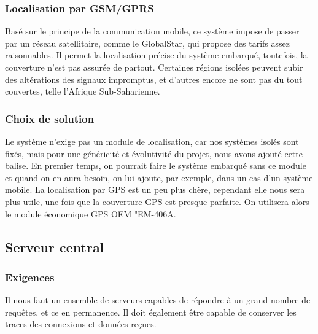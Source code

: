 \subsubsection{Localisation par GSM/GPRS}

Basé sur le principe de la communication mobile, ce système impose de passer par un réseau satellitaire, comme le GlobalStar, qui propose des tarifs assez raisonnables. Il permet la localisation précise du système embarqué, toutefois, la couverture n’est pas assurée de partout. Certaines régions isolées peuvent subir des altérations des signaux impromptus, et d’autres encore ne sont pas du tout couvertes, telle l’Afrique Sub-Saharienne.

\subsubsection{Choix de solution}
Le système n’exige pas un module de localisation, car nos systèmes isolés sont fixés, mais pour une généricité et évolutivité du projet, nous avons ajouté cette balise. 
En premier temps, on pourrait faire le système embarqué sans ce module et quand on en aura besoin, on lui ajoute, par exemple, dans un cas d’un système mobile. 
La localisation par GPS est un peu plus chère, cependant elle nous sera plus utile, une fois que la couverture GPS est presque parfaite. On utilisera alors le module économique GPS OEM "EM-406A.
	
	
\subsection{Serveur central}

    \subsubsection{Exigences}
    Il nous faut un ensemble de serveurs capables de répondre à un grand
    nombre de requêtes, et ce en permanence. Il doit également être capable
    de conserver les traces des connexions et données reçues.

